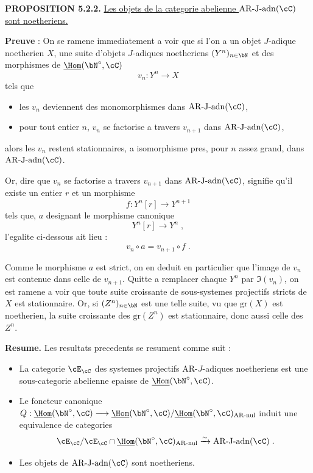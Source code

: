 \medskip
\noindent\textbf{PROPOSITION 5.2.2.} \underline{Les objets de la categorie abelienne $\mathrm{AR\text{-}J\text{-}adn}(\cC)$ sont noetheriens.}

\textbf{Preuve} : On se ramene immediatement a voir que si l'on a un objet $J$-adique noetherien $X$, une suite d'objets $J$-adiques noetheriens $(Y^n)_{n \in \bN}$ et des morphismes de $\underline{\Hom}(\bN^\circ, \cC)$
\[
v_n : Y^n \longrightarrow X
\]
tels que
\begin{itemize}
\item[(i)] les $v_n$ deviennent des monomorphismes dans $\mathrm{AR\text{-}J\text{-}adn}(\cC)$,
\item[(ii)] pour tout entier $n$, $v_n$ se factorise a travers $v_{n+1}$ dans $\mathrm{AR\text{-}J\text{-}adn}(\cC)$,
\end{itemize}
alors les $v_n$ restent stationnaires, a isomorphisme pres, pour $n$ assez grand, dans $\mathrm{AR\text{-}J\text{-}adn}(\cC)$.

Or, dire que $v_n$ se factorise a travers $v_{n+1}$ dans $\mathrm{AR\text{-}J\text{-}adn}(\cC)$, signifie qu'il existe un entier $r$ et un morphisme
\[
f : Y^n[r] \longrightarrow Y^{n+1}
\]
tels que, $a$ designant le morphisme canonique
\[
Y^n[r] \longrightarrow Y^n\;,
\]
l'egalite ci-dessous ait lieu :
\[
v_n \circ a = v_{n+1} \circ f\;.
\]

Comme le morphisme $a$ est strict, on en deduit en particulier que l'image de $v_n$ est contenue dans celle de $v_{n+1}$. Quitte a remplacer chaque $Y^n$ par $\Im(v_n)$, on est ramene a voir que toute suite croissante de sous-systemes projectifs stricts de $X$ est stationnaire. Or, si $(Z^n)_{n \in \bN}$ est une telle suite, vu que $\mathrm{gr}(X)$ est noetherien, la suite croissante des $\mathrm{gr}(Z^n)$ est stationnaire, donc aussi celle des $Z^n$.

\medskip
\noindent\textbf{Resume.} Les resultats precedents se resument comme suit :
\begin{itemize}
\item[(i)] La categorie $\cE_\cC$ des systemes projectifs AR-$J$-adiques noetheriens est une sous-categorie abelienne epaisse de $\underline{\Hom}(\bN^\circ, \cC)$.
\item[(ii)] Le foncteur canonique $Q : \underline{\Hom}(\bN^\circ, \cC) \longrightarrow \underline{\Hom}(\bN^\circ, \cC) / \underline{\Hom}(\bN^\circ, \cC)_{\mathrm{AR\text{-}nul}}$ induit une equivalence de categories
\[
\cE_\cC / \cE_\cC \cap \underline{\Hom}(\bN^\circ, \cC)_{\mathrm{AR\text{-}nul}} \xrightarrow{\sim} \mathrm{AR\text{-}J\text{-}adn}(\cC)\;.
\]
\item[(iii)] Les objets de $\mathrm{AR\text{-}J\text{-}adn}(\cC)$ sont noetheriens.
\end{itemize}

